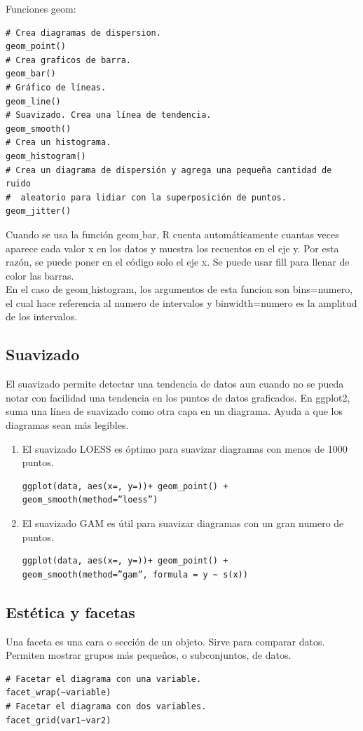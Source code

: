 \documentclass[a4paper, 12pt]{book}
\begin{document}
Funciones geom:
\begin{verbatim}
# Crea diagramas de dispersion.
geom_point()
# Crea graficos de barra.
geom_bar()
# Gráfico de líneas.
geom_line()
# Suavizado. Crea una línea de tendencia.
geom_smooth()
# Crea un histograma.
geom_histogram()
# Crea un diagrama de dispersión y agrega una pequeña cantidad de ruido
#  aleatorio para lidiar con la superposición de puntos.
geom_jitter()
\end{verbatim}
Cuando se usa la función geom$\_$bar, R cuenta automáticamente cuantas veces aparece cada valor x en los datos y muestra los recuentos en el eje y. Por esta razón, se puede poner en el código solo el eje x. Se puede usar fill para llenar de color las barras. \\
En el caso de geom$\_$histogram, los argumentos de esta funcion son bins=numero, el cual hace referencia al numero de intervalos y binwidth=numero es la amplitud de los intervalos.
\subsection{Suavizado}
El suavizado permite detectar una tendencia de datos aun cuando no se pueda notar con facilidad una tendencia en los puntos de datos graficados. En ggplot2, suma una línea de suavizado como otra capa en un diagrama. Ayuda a que los diagramas sean más legibles.
\begin{enumerate}
\item El suavizado LOESS es óptimo para suavizar diagramas con menos de 1000 puntos.
\begin{verbatim}
ggplot(data, aes(x=, y=))+ geom_point() + geom_smooth(method=”loess”)
\end{verbatim}
\item El suavizado GAM es útil para suavizar diagramas con un gran numero de puntos.
\begin{verbatim}
ggplot(data, aes(x=, y=))+ geom_point() +  geom_smooth(method=”gam”, formula = y ~ s(x))
\end{verbatim}
\end{enumerate}
\subsection{Estética y facetas}
Una faceta es una cara o sección de un objeto. Sirve para comparar datos. Permiten mostrar grupos más pequeños, o subconjuntos, de datos.
\begin{verbatim}
# Facetar el diagrama con una variable.
facet_wrap(~variable)
# Facetar el diagrama con dos variables.
facet_grid(var1~var2)
\end{verbatim}
\end{document}
